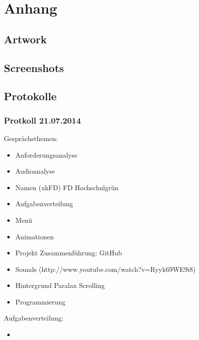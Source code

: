 \documentclass[Skript.tex]{subfiles}
\begin{document}
\newpage
\appendix 
\section{Anhang}

\subsection{Artwork}

\subsection{Screenshots}

\subsection{Protokolle}

\subsubsection*{Protkoll 21.07.2014}

Gesprächsthemen:

\begin{itemize}
\item Anforderungsanalyse
\item Audioanalyse 
\item Namen (xkFD) FD Hochschulgrün
\item Aufgabenverteilung
\item Menü
\item Animationen
\item Projekt Zusammenführung: GitHub
\item Sounds (http://www.youtube.com/watch?v=Ryyk69WE9i8)
\item Hintergrund Paralax Scrolling
\item Programmierung
\end{itemize}


Aufgabenverteilung:

\begin{itemize}
\item

\end{itemize}
\end{document}
